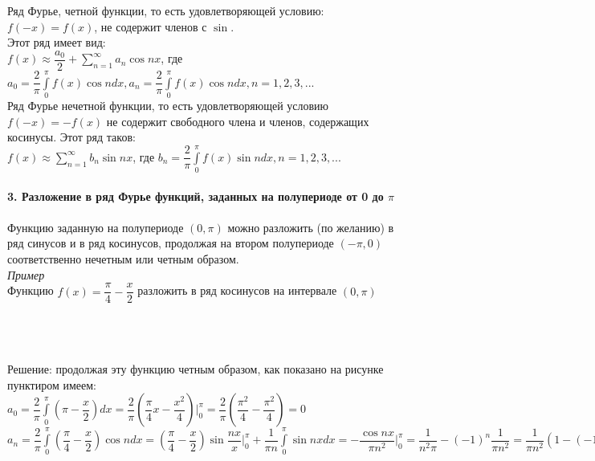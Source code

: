 \documentclass{article}
\numberwithin{equation}{section}
\begin{document}
\\\\
Ряд Фурье, четной функции, то есть удовлетворяющей условию: $f(-x)=f(x)$, не содержит членов с $\sin$.\\
Этот ряд имеет вид:\\
$f(x)\approx\dfrac{a_0}{2}+\sum\limits_{n=1}^\infty a_n\cos nx$, где $a_0=\dfrac{2}{\pi}\int\limits_0^\pi f(x)\cos ndx,a_n=\dfrac{2}{\pi}\int\limits_0^\pi f(x)\cos ndx,n=1,2,3,...$\\
Ряд Фурье нечетной функции, то есть удовлетворяющей условию $f(-x)=-f(x)$ не содержит свободного члена и членов, содержащих косинусы. Этот ряд таков:\\
$f(x)\approx\sum\limits_{n=1}^\infty b_n\sin nx$, где $b_n=\dfrac{2}{\pi}\int\limits_0^\pi f(x)\sin ndx,n=1,2,3,...$
\\\\
\textbf{3. Разложение в ряд Фурье функций, заданных на полупериоде от 0 до $\pi$}
\\\\
Функцию заданную на  полупериоде $(0,\pi)$ можно разложить (по желанию) в ряд синусов и в ряд косинусов, продолжая на втором полупериоде $(-\pi,0)$ соответственно нечетным или четным образом.\\
\textit{Пример}\\
Функцию $f(x)=\dfrac{\pi}{4}-\dfrac{x}{2}$ разложить в ряд косинусов на интервале $(0,\pi)$\\\\
\\\\
Решение: продолжая эту функцию четным образом, как показано на рисунке пунктиром имеем:\\
$a_0=\dfrac{2}{\pi}\int\limits_0^\pi(\pi-\dfrac{x}{2})dx=\dfrac{2}{\pi}(\dfrac{\pi}{4}x-\dfrac{x^2}{4})\bigg|_0^\pi=\dfrac{2}{\pi}(\dfrac{\pi^2}{4}-\dfrac{\pi^2}{4})=0$\\
$a_n=\dfrac{2}{\pi}\int\limits_0^\pi(\dfrac{\pi}{4}-\dfrac{x}{2})\cos ndx=(\dfrac{\pi}{4}-\dfrac{x}{2})\sin\dfrac{nx}{x}\bigg|_0^\pi+\dfrac{1}{\pi n}\int\limits_0^\pi\sin nxdx=-\dfrac{\cos nx}{\pi n^2}\bigg|_0^\pi=\dfrac{1}{n^2\pi}-(-1)^n\dfrac{1}{\pi n^2}=\dfrac{1}{\pi n^2}(1-(-1)^n)$\\
\end{document}
